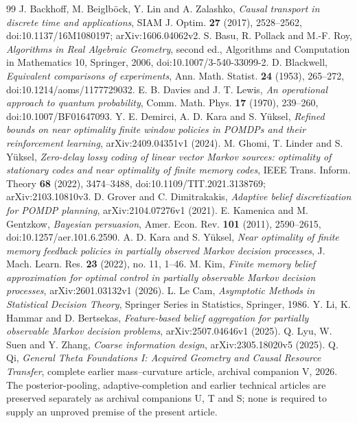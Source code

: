 \begin{thebibliography}{99}
 J. Backhoff, M. Beiglb\"ock, Y. Lin and A. Zalashko, \emph{Causal transport in discrete time and applications}, SIAM J. Optim. \textbf{27} (2017), 2528--2562, doi:10.1137/16M1080197; arXiv:1606.04062v2.
 S. Basu, R. Pollack and M.-F. Roy, \emph{Algorithms in Real Algebraic Geometry}, second ed., Algorithms and Computation in Mathematics 10, Springer, 2006, doi:10.1007/3-540-33099-2.
 D. Blackwell, \emph{Equivalent comparisons of experiments}, Ann. Math. Statist. \textbf{24} (1953), 265--272, doi:10.1214/aoms/1177729032.
 E. B. Davies and J. T. Lewis, \emph{An operational approach to quantum probability}, Comm. Math. Phys. \textbf{17} (1970), 239--260, doi:10.1007/BF01647093.
 Y. E. Demirci, A. D. Kara and S. Y\"uksel, \emph{Refined bounds on near optimality finite window policies in POMDPs and their reinforcement learning}, arXiv:2409.04351v1 (2024).
 M. Ghomi, T. Linder and S. Y\"uksel, \emph{Zero-delay lossy coding of linear vector Markov sources: optimality of stationary codes and near optimality of finite memory codes}, IEEE Trans. Inform. Theory \textbf{68} (2022), 3474--3488, doi:10.1109/TIT.2021.3138769; arXiv:2103.10810v3.
 D. Grover and C. Dimitrakakis, \emph{Adaptive belief discretization for POMDP planning}, arXiv:2104.07276v1 (2021).
 E. Kamenica and M. Gentzkow, \emph{Bayesian persuasion}, Amer. Econ. Rev. \textbf{101} (2011), 2590--2615, doi:10.1257/aer.101.6.2590.
 A. D. Kara and S. Y\"uksel, \emph{Near optimality of finite memory feedback policies in partially observed Markov decision processes}, J. Mach. Learn. Res. \textbf{23} (2022), no. 11, 1--46.
 M. Kim, \emph{Finite memory belief approximation for optimal control in partially observable Markov decision processes}, arXiv:2601.03132v1 (2026).
 L. Le Cam, \emph{Asymptotic Methods in Statistical Decision Theory}, Springer Series in Statistics, Springer, 1986.
 Y. Li, K. Hammar and D. Bertsekas, \emph{Feature-based belief aggregation for partially observable Markov decision problems}, arXiv:2507.04646v1 (2025).
 Q. Lyu, W. Suen and Y. Zhang, \emph{Coarse information design}, arXiv:2305.18020v5 (2025).
 Q. Qi, \emph{General Theta Foundations I: Acquired Geometry and Causal Resource Transfer}, complete earlier mass--curvature article, archival companion V, 2026. The posterior-pooling, adaptive-completion and earlier technical articles are preserved separately as archival companions U, T and S; none is required to supply an unproved premise of the present article.

\end{thebibliography}
